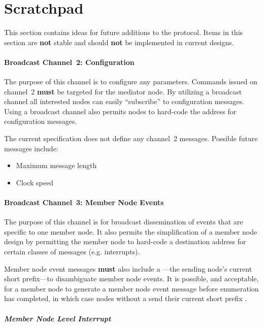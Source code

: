 \section{Scratchpad}
This section contains ideas for future additions to the \bus protocol. Items
in this section are {\bf not} stable and should {\bf not} be implemented in
current \bus designs.

\paragraph{Broadcast Channel~2: \bus Configuration}
\label{sec:channel-2}

The purpose of this channel is to configure any \bus parameters. Commands
issued on channel~2 {\bf must} be targeted for the mediator node. By utilizing
a broadcast channel all interested nodes can easily ``subscribe'' to
configuration messages. Using a broadcast channel also permits nodes to
hard-code the address for configuration messages.

The current \bus specification does not define any channel~2 messages.
Possible future messages include:
\begin{itemize}
  \item Maximum message length
  \item Clock speed
\end{itemize}

\paragraph{Broadcast Channel~3: Member Node Events}
\label{sec:channel-3}

The purpose of this channel is for broadcast dissemination of events that are
specific to one member node.  It also permits the simplification of a member
node design by permitting the member node to hard-code a destination address
for certain classes of messages (e.g. interrupts).

Member node event messages {\bf must} also include a ---the sending node's current short prefix---to disambiguate
member node events. It is possible, and acceptable, for a member node to
generate a member node event message before enumeration has completed, in
which case nodes without a  send
their current short prefix .


\subparagraph{Member Node Level Interrupt}
\label{cmd:level-interrupt}
~


